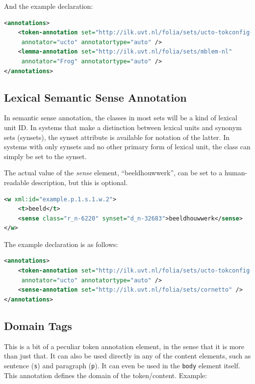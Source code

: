 \documentclass[a4paper,12pt]{report}
\begin{document}
And the example declaration:

\begin{lstlisting}[language=xml]
<annotations>
    <token-annotation set="http://ilk.uvt.nl/folia/sets/ucto-tokconfig-nl" 
     annotator="ucto" annotatortype="auto" />
    <lemma-annotation set="http://ilk.uvt.nl/folia/sets/mblem-nl"
     annotator="Frog" annotatortype="auto" />
</annotations>
\end{lstlisting}


\subsection{Lexical Semantic Sense Annotation}

In semantic sense annotation, the classes in most sets will be a kind of lexical unit ID. In systems that make a distinction between lexical units and synonym sets (synsets), the synset attribute is available for notation of the latter. In systems with only synsets and no other primary form of lexical unit, the class can simply be set to the synset.

The actual value of the \emph{sense} element, ``beeldhouwwerk'', can be set to a human-readable description, but this is optional.

\begin{lstlisting}[language=xml]
<w xml:id="example.p.1.s.1.w.2">
    <t>beeld</t>
    <sense class="r_n-6220" synset="d_n-32683">beeldhouwwerk</sense>
</w>
\end{lstlisting}

The example declaration is as follows:

\begin{lstlisting}[language=xml]
<annotations>
    <token-annotation set="http://ilk.uvt.nl/folia/sets/ucto-tokconfig-nl"
     annotator="ucto" annotatortype="auto" />
    <sense-annotation set="http://ilk.uvt.nl/folia/sets/cornetto" />
</annotations>
\end{lstlisting}

\subsection{Domain Tags}

This is a bit of a peculiar token annotation element, in the sense that it is more than just that. It can also be used directly in any of the content elements, such as sentence (\texttt{s}) and  paragraph (\texttt{p}). It can even be used in the \texttt{body} element itself. This annotation defines the domain of the token/content. Example:
\end{document}
